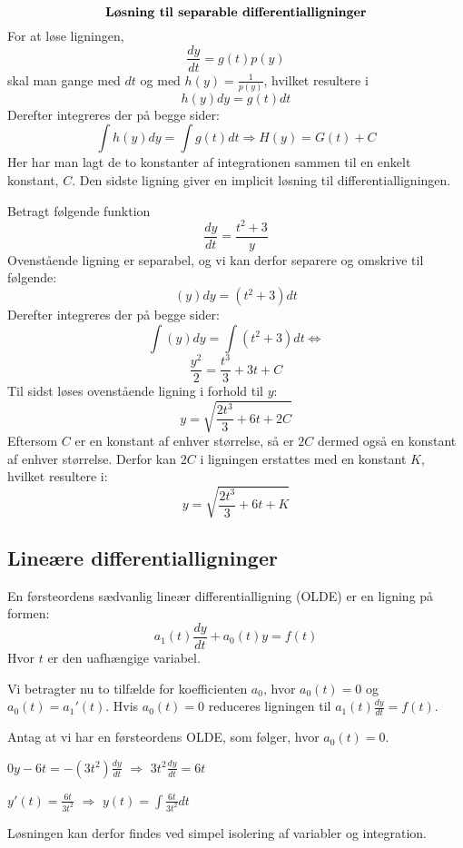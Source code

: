\begin{tcolorbox}
\begin{equation}\label{LSD}
\textbf{Løsning til separable differentialligninger}\\
\end{equation}
For at løse ligningen, $$\frac{dy}{dt} = g(t)p(y)$$ skal man gange med $dt$ og med $h(y)=\frac{1}{p(y)}$, hvilket resultere i $$h(y)dy=g(t)dt$$ Derefter integreres der på begge sider: $$\int h(y)dy= \int g(t)dt \Longrightarrow H(y)=G(t)+C$$ Her har man lagt de to konstanter af integrationen sammen til en enkelt konstant, $C$. Den sidste ligning giver en implicit løsning til differentialligningen.
\end{tcolorbox}

\begin{Example}\hfill \break
\textnormal{Betragt følgende funktion} $$\frac{dy}{dt}=\frac{t^2+3}{y}$$ \textnormal{Ovenstående ligning er separabel, og vi kan derfor separere og omskrive til følgende:} $$(y)dy=(t^2+3)dt$$ \textnormal{Derefter integreres der på begge sider:} $$\int (y)dy=\int (t^2+3)dt\Leftrightarrow$$ $$\frac{y^2}{2}=\frac{t^3}{3}+3t+C$$ \textnormal{Til sidst løses ovenstående ligning i forhold til} $y$:$$y=\sqrt{\frac{2t^3}{3}+6t+2C}$$ \textnormal{Eftersom $C$ er en konstant af enhver størrelse, så er $2C$ dermed også en konstant af enhver størrelse. Derfor kan $2C$ i ligningen erstattes med en konstant $K$, hvilket resultere i:} $$y=\sqrt{\frac{2t^3}{3}+6t+K}$$
\end{Example}

\subsection{Lineære differentialligninger}

En førsteordens sædvanlig lineær differentialligning (OLDE) er en ligning på formen: \\ 
$$a_{1}(t) \frac{dy}{dt} + a_{0}(t)y = f(t)$$ Hvor $t$ er den uafhængige variabel. \hfill \break

Vi betragter nu to tilfælde for koefficienten $a_0$, hvor $a_0(t) = 0$ og $a_0(t) = a_1'(t)$. Hvis $a_0(t) = 0$ reduceres ligningen til $a_1(t)\frac{dy}{dt} = f(t)$.  
\begin{Example}\hfill \break
\textnormal{Antag at vi har en førsteordens OLDE, som følger, hvor $a_0(t) = 0$.}\\
\hfill \break
\centerline{$0y - 6t = -(3t^2) \frac{dy}{dt}$ $\Rightarrow$ $3t^2 \frac{dy}{dt} = 6t$}
\hfill \break
\centerline{$y'(t) = \frac{6t}{3t^2}$ $\Rightarrow$ $y(t) = \int \frac{6t}{3t^2}dt$}
\hfill \break
\textnormal{Løsningen kan derfor findes ved simpel isolering af variabler og integration.}
\end{Example}


